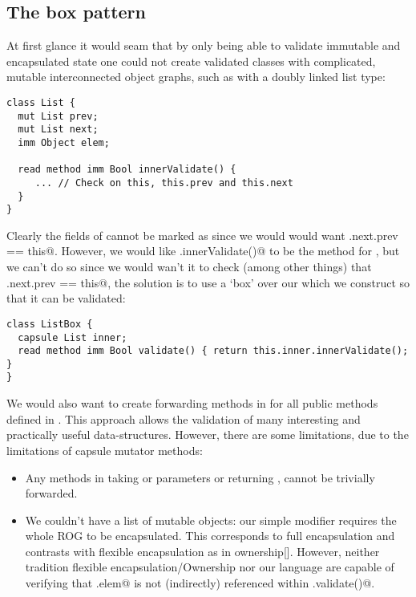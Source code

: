 \subsection{The box pattern}
At first glance it would seam that by only being able to validate immutable and encapsulated state one could not create validated classes with complicated, mutable interconnected object graphs, such as with a doubly linked list type:
\begin{lstlisting}[escapechar=\%]
class List {
  mut List prev;
  mut List next;
  imm Object elem;
  
  read method imm Bool innerValidate() {
     ... // Check on this, this.prev and this.next
  }
}
\end{lstlisting}
Clearly the \Q@mut@ fields of \Q@List@ cannot be marked as \Q@capsule@ since we would would want \Q@this.next.prev == this@.
However, we would like \Q@.innerValidate()@ to be the \Q@validate@ method for \Q@list@, but we can’t do so since we would wan’t it to check (among other things) that \Q@this.next.prev == this@, the solution is to use a `box' over our \Q@List@ which we construct so that it can be validated:

\begin{lstlisting}[escapechar=\%]
class ListBox { 
  capsule List inner;
  read method imm Bool validate() { return this.inner.innerValidate(); }
}
\end{lstlisting}
We would also want to create forwarding methods in \Q@ListBox@ for all public methods defined in \Q@List@. This approach allows the validation of many interesting and practically useful data-structures.
However, there are some limitations, due to the limitations of capsule mutator methods:
\begin{itemize}
	\item Any \Q@mut@ methods in \Q@ListBox@ taking \Q@read@ or \Q@mut@ parameters or returning \Q@mut@, cannot be trivially forwarded.
	\item We couldn't have a list of mutable objects:
our simple \Q@capsule@ modifier requires the whole ROG to be encapsulated.
This corresponds to full encapsulation and contrasts with flexible encapsulation as in 
ownership[]. However, neither tradition flexible encapsulation/Ownership nor our language are capable of verifying that \Q@List.elem@ is not (indirectly) referenced within \Q@ListBox.validate()@.
\end{itemize}